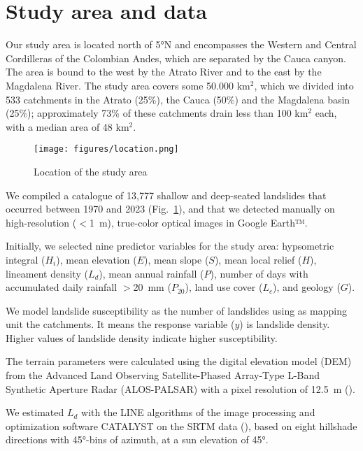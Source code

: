 \documentclass[
  manuscript=article,  
  layout=preprint,  
  year=2023,
  volume=0,
]{format}
\begin{document}
\section{Study area and data}
\par Our study area is located north of 5°N and encompasses the Western and Central Cordilleras of the Colombian Andes, which are separated by the Cauca canyon. The area is bound to the west by the Atrato River and to the east by the Magdalena River. The study area covers some 50.000 km$^2$, which we divided into 533 catchments in the Atrato (25\%), the Cauca (50\%) and the Magdalena basin (25\%); approximately 73\% of these catchments drain less than 100 km$^{2}$ each, with a median area of 48 km$^{2}$.

\begin{figure}[ht!]
    \centering
   {\texttt{[image: figures/location.png]}}
    \caption{Location of the study area}
    \label{fig:location}
\end{figure}

\par We compiled a catalogue of 13,777 shallow and deep-seated landslides that occurred between 1970 and 2023 (Fig.~\ref{fig:location}), and that we detected manually on high-resolution ($<$1~m), true-color optical images in Google Earth™.

\par Initially, we selected nine predictor variables for the study area: hypsometric integral ($H_i$), mean elevation ($E$), mean slope ($S$), mean local relief ($H$), lineament density ($L_d$), mean annual rainfall ($P$), number of days with accumulated daily rainfall $>$20~mm ($P_\text{20}$), land use cover ($L_c$), and geology ($G$). 

\par We model landslide susceptibility as the number of landslides using as mapping unit the catchments. It means the response variable ($y$) is landslide density. Higher values of landslide density indicate higher susceptibility.

\par The terrain parameters were calculated using the digital elevation model (DEM) from the Advanced Land Observing Satellite-Phased Array-Type L-Band Synthetic Aperture Radar (ALOS-PALSAR) with a pixel resolution of 12.5~m (\cite{logan2014}). 

\par We estimated $L_d$ with the LINE algorithms of the image processing and optimization software CATALYST on the SRTM data (\cite{villalta2002}), based on eight hillshade directions with 45°-bins of azimuth, at a sun elevation of 45°.  
\end{document}
